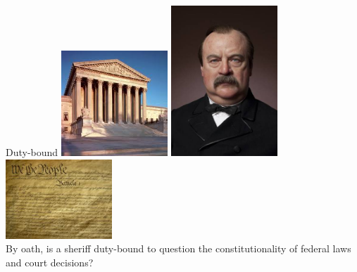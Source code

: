 
% 
\begin{frame}{Duty-bound}
    \centering
    \includegraphics[width=0.3\textwidth]{img/court-bldg.png}
    \includegraphics[width=0.3\textwidth]{img/cleveland.png}
    \includegraphics[width=0.3\textwidth]{img/constitution.png} \\
    \vspace{18pt}
    By oath, is a sheriff duty-bound to question the constitutionality of federal laws and court decisions? \\
\end{frame}

